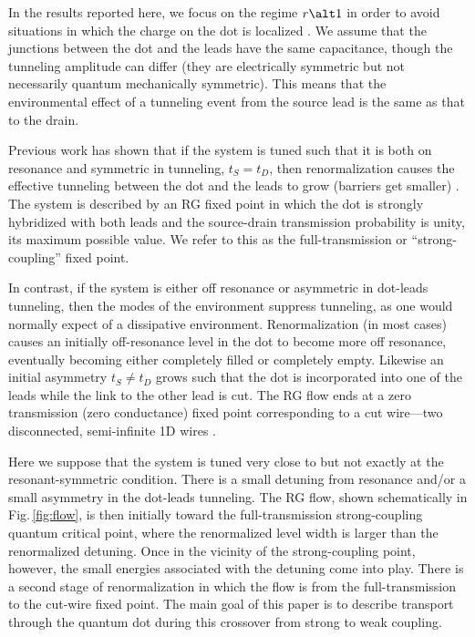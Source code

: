 \documentclass[aps,prb,reprint,floatfix,superscriptaddress,amssymb,amsmath]{revtex4-2}
\begin{document}
In the results reported here, we focus on the regime $r \alt 1$ in order to avoid situations in which the charge on the dot is localized \cite{LargeR}.
We assume that the junctions between the dot and the leads have the same capacitance, though the tunneling amplitude can differ (they are electrically symmetric but not necessarily quantum mechanically symmetric). This means that the environmental effect of a tunneling event from the source lead is the same as that to the drain.      

Previous work has shown that if the system is tuned such that it is both on resonance and symmetric in tunneling, $t_S = t_D$, then renormalization causes the effective tunneling between the dot and the leads to grow (barriers get smaller)  \cite{Mebrahtu12, Mebrahtu13, LiuRLdissipPRB14}. The system is described by an RG fixed point in which the dot is strongly hybridized with both leads and the source-drain transmission probability is unity, its maximum possible value. We refer to this as the full-transmission or ``strong-coupling'' fixed point. 

In contrast, if the system is either off resonance or asymmetric in dot-leads tunneling, then the modes of the environment suppress tunneling, as one would normally expect of a dissipative environment.
Renormalization (in most cases) causes an initially off-resonance level in the dot to become more off resonance, eventually becoming either completely filled or completely empty. 
Likewise an initial asymmetry $t_S \neq t_D$ grows such that the dot is incorporated into one of the leads while the link to the other lead is cut. The RG flow ends at a zero transmission (zero conductance) fixed point corresponding to a cut wire---two disconnected, semi-infinite 1D wires \cite{AsymmetricFP}. 

Here we suppose that the system is tuned very close to but not exactly at the resonant-symmetric condition. There is a small detuning from resonance and/or a small asymmetry in the dot-leads tunneling. The RG flow, shown schematically in Fig.\,\ref{fig:flow}, is then initially toward the full-transmission strong-coupling quantum critical point, where the renormalized level width is larger than the renormalized detuning. 
Once in the vicinity of the strong-coupling point, however, the small energies associated with the detuning come into play. There is a second stage of renormalization in which the flow is from the full-transmission to the cut-wire fixed point. The main goal of this paper is to describe transport through the quantum dot during this crossover from strong to weak coupling. 
\end{document}
